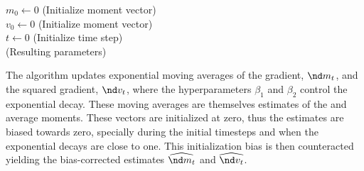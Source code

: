 \begin{algorithm}[H]
  \SetAlgoLined
  \KwIn{$\beta_1, \beta_2 \in [0, 1)$: Exponential decay rates for the moment estimates}
  $m_0 \leftarrow 0$ (Initialize  moment vector)\\
  $v_0 \leftarrow 0$ (Initialize  moment vector)\\
  $t \leftarrow 0$ (Initialize time step)\\

   (Resulting parameters)

  \caption{Adam algorithm. Good default values for the hyperparameters are $\alpha=0.001$, $\beta_1=0.9$, $\beta_2=0.999$ and $\epsilon=10^{-8}$. All operations on vectors are element wise. With $\beta_1^t$ and $\beta_2^t$ being $\beta_1$ and $\beta_2$ to the power of $t$\cite{kingma2014adam}.}
  \label{alg:adam}
\end{algorithm}

The algorithm updates exponential moving averages of the gradient, $\nd m_t$, and the squared gradient, $\nd v_t$, where the hyperparameters $\beta_1$ and $\beta_2$ control the exponential decay. These moving averages are themselves estimates of the  and  average moments. These vectors are initialized at zero, thus the estimates are biased towards zero, specially during the initial timesteps and when the exponential decays are close to one. This initialization bias is then counteracted yielding the bias-corrected estimates $\widehat{\nd m_t}$ and $\widehat{\nd v_t}$.

